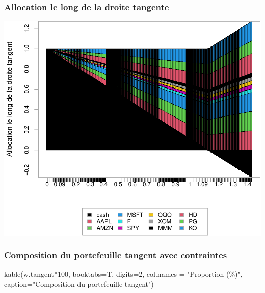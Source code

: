 \documentclass[
]{article}
\newenvironment{Shaded}{\begin{snugshade}}{\end{snugshade}}
\newcommand{\AttributeTok}[1]{\textcolor[rgb]{0.77,0.63,0.00}{#1}}
\newcommand{\DecValTok}[1]{\textcolor[rgb]{0.00,0.00,0.81}{#1}}
\newcommand{\FunctionTok}[1]{\textcolor[rgb]{0.00,0.00,0.00}{#1}}
\newcommand{\NormalTok}[1]{#1}
\newcommand{\SpecialCharTok}[1]{\textcolor[rgb]{0.00,0.00,0.00}{#1}}
\newcommand{\StringTok}[1]{\textcolor[rgb]{0.31,0.60,0.02}{#1}}
\begin{document}
\hypertarget{allocation-le-long-de-la-droite-tangente-2}{%
\subsubsection{Allocation le long de la droite
tangente}\label{allocation-le-long-de-la-droite-tangente-2}}

\includegraphics{TP-2_files/figure-latex/unnamed-chunk-21-1.pdf}

\hypertarget{composition-du-portefeuille-tangent-avec-contraintes-1}{%
\subsubsection{Composition du portefeuille tangent avec
contraintes}\label{composition-du-portefeuille-tangent-avec-contraintes-1}}

\begin{Shaded}
\begin{Highlighting}[]
\FunctionTok{kable}\NormalTok{(w.tangent}\SpecialCharTok{*}\DecValTok{100}\NormalTok{, }\AttributeTok{booktabs=}\NormalTok{T, }\AttributeTok{digits=}\DecValTok{2}\NormalTok{, }\AttributeTok{col.names =} \StringTok{"Proportion (\%)"}\NormalTok{,}
      \AttributeTok{caption=}\StringTok{"Composition du portefeuille tangent"}\NormalTok{)}
\end{Highlighting}
\end{Shaded}
\end{document}
